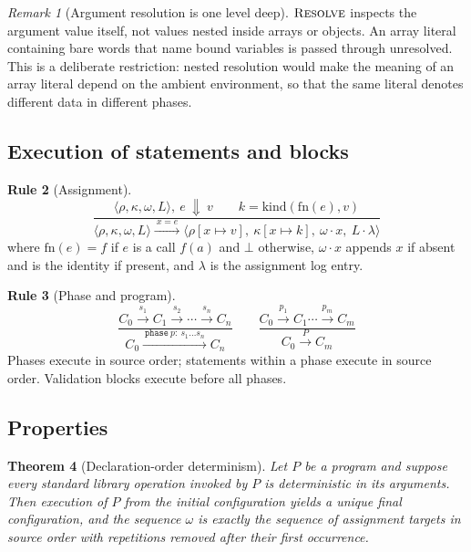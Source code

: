 \documentclass[11pt,twocolumn,a4paper]{article}
\theoremstyle{ssthm}
\newtheorem{theorem}{Theorem}[section]
\theoremstyle{definition}
\newtheorem{rulename}[theorem]{Rule}
\theoremstyle{remark}
\newtheorem{remark}[theorem]{Remark}
\newcommand{\shk}[1]{\texttt{#1}}
\newcommand{\evalto}{\Downarrow}
\newcommand{\Env}{\rho}
\newcommand{\Kinds}{\kappa}
\newcommand{\Ord}{\omega}
\newcommand{\Prog}{P}
\begin{document}
\begin{remark}[Argument resolution is one level deep]
\label{rem:resolve-depth}
$\textsc{Resolve}$ inspects the argument value itself, not values nested
inside arrays or objects. An array literal containing bare words that
name bound variables is passed through unresolved. This is a
deliberate restriction: nested resolution would make the meaning of an
array literal depend on the ambient environment, so that the same
literal denotes different data in different phases.
\end{remark}

\subsection{Execution of statements and blocks}

\begin{rulename}[Assignment]
\label{rule:assign}
\[
\frac{\langle\Env,\Kinds,\Ord,L\rangle,\ e\ \evalto\ v \qquad
      k=\mathrm{kind}(\mathrm{fn}(e),v)}
{\langle\Env,\Kinds,\Ord,L\rangle \xrightarrow{\ x=e\ }
 \langle\Env[x\mapsto v],\ \Kinds[x\mapsto k],\ \Ord\cdot x,\ L\cdot\lambda\rangle}
\]
where $\mathrm{fn}(e)=f$ if $e$ is a call $f(a)$ and $\bot$ otherwise,
$\Ord\cdot x$ appends $x$ if absent and is the identity if present, and
$\lambda$ is the assignment log entry.
\end{rulename}

\begin{rulename}[Phase and program]
\label{rule:phase}
\[
\frac{C_0 \xrightarrow{s_1} C_1 \xrightarrow{s_2}\cdots\xrightarrow{s_n} C_n}
{C_0 \xrightarrow{\ \shk{phase}\ p:\ s_1\dots s_n\ } C_n}
\qquad
\frac{C_0 \xrightarrow{p_1} C_1 \cdots \xrightarrow{p_m} C_m}
{C_0 \xrightarrow{\ \Prog\ } C_m}
\]
Phases execute in source order; statements within a phase execute in
source order. Validation blocks execute before all phases.
\end{rulename}

\subsection{Properties}

\begin{theorem}[Declaration-order determinism]
\label{thm:determinism}
Let $\Prog$ be a program and suppose every standard library operation
invoked by $\Prog$ is deterministic in its arguments. Then execution of
$\Prog$ from the initial configuration yields a unique final
configuration, and the sequence $\Ord$ is exactly the sequence of
assignment targets in source order with repetitions removed after their
first occurrence.
\end{theorem}
\end{document}
